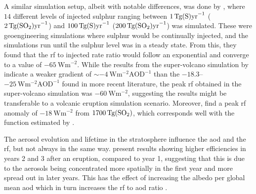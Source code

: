 \documentclass{ametsocV6.1}
\begin{document}
A similar simulation setup, albeit with notable differences, was done by
\citet{niemeier2015}, where \(14\) different levels of injected sulphur ranging between
\(\SI{1}{\tera\gram(\ce{S})\mathrm{yr}^{-1}}\)
(\(\SI{2}{\tera\gram(\ce{SO2})\mathrm{yr}^{-1}}\)) and
\(\SI{100}{\tera\gram(\ce{S})\mathrm{yr}^{-1}}\)
(\(\SI{200}{\tera\gram(\ce{SO2})\mathrm{yr}^{-1}}\)) was simulated. These were
geoengineering simulations where sulphur would be continually injected, and the
simulations run until the sulphur level was in a steady state. From this, they found
that the \gls{rf} to injected  rate ratio would follow an exponential and
converge to a value of \(\SI{-65}{\watt\metre^{-2}}\). While the results from the
super-volcano simulation by \citet{jones2005} indicate a weaker gradient of \(\sim
\SI{-4}{\watt\metre^{-2}\mathrm{AOD}^{-1}}\) than the
\(-18.3\)--\(\SI{-25}{\watt\metre^{-2}\mathrm{AOD}^{-1}}\) found in more recent
literature, the peak \gls{rf} obtained in the super-volcano simulation was
\(\SI{-60}{\watt\metre^{-2}}\), suggesting the \citet{niemeier2015} results might be
transferable to a volcanic eruption simulation scenario. Moreover, \citet{timmreck2010}
find a peak \gls{rf} anomaly of \(\SI{-18}{\watt\metre^{-2}}\) from
\(\SI{1700}{\tera\gram(\ce{SO2})}\), which corresponds well with the function estimated
by \citet{niemeier2015}.


The aerosol evolution and lifetime in the stratosphere influence the \gls{aod} and the
\gls{rf}, but not always in the same way. \citet{marshall2020} present results showing
higher efficiencies in years 2 and 3 after an eruption, compared to year 1, suggesting
that this is due to the aerosols being concentrated more spatially in the first year and
more spread out in later years. This has the effect of increasing the albedo per global
mean \gls{aod} which in turn increases the \gls{rf} to \gls{aod} ratio
\citep{marshall2020}.
\end{document}
